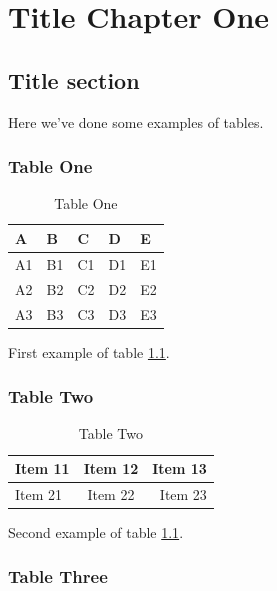 \chapter{Title Chapter One}

\section{Title section}

Here we've done some examples of tables.

\subsection{Table One}
\begin{table}[h]
  \centering
  \begin{tabular}{|lllll|}
    \toprule
    A  & B  & C  & D  & E  \\
    \midrule
    A1 & B1 & C1 & D1 & E1 \\
    A2 & B2 & C2 & D2 & E2 \\
    A3 & B3 & C3 & D3 & E3 \\
    \bottomrule
  \end{tabular}
  \caption{Table One}
  \label{Tab:tableone}
\end{table}
First example of table \ref{Tab:tableone}.
\subsection{Table Two}

\begin{table}[ht]
  \centering
  \begin{tabular}{|l|c|r|}
    \hline
    Item 11 & Item 12 & Item 13 \\
    \hline
    Item 21 & Item 22 & Item 23 \\
    \hline
  \end{tabular}
  \caption{Table Two}
  \label{Tab:tabletwo}
\end{table}
Second example of table \ref{Tab:tableone}.
\lipsum[1-1]
\subsection{Table Three}

